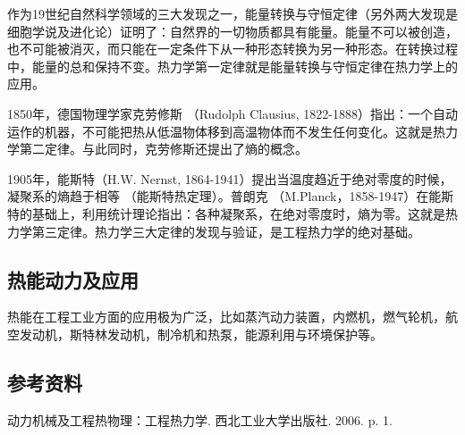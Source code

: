 作为19世纪自然科学领域的三大发现之一，能量转换与守恒定律（另外两大发现是细胞学说及进化论）证明了：自然界的一切物质都具有能量。能量不可以被创造，也不可能被消灭，而只能在一定条件下从一种形态转换为另一种形态。在转换过程中，能量的总和保持不变。热力学第一定律就是能量转换与守恒定律在热力学上的应用。

1850年，德国物理学家克劳修斯 （Rudolph Clausius, 1822-1888）指出：一个自动运作的机器，不可能把热从低温物体移到高温物体而不发生任何变化。这就是热力学第二定律。与此同时，克劳修斯还提出了熵的概念。

1905年，能斯特（H.W. Nernst, 1864-1941）提出当温度趋近于绝对零度的时候， 凝聚系的熵趋于相等 （能斯特热定理）。普朗克 （M.Planck，1858-1947）在能斯特的基础上，利用统计理论指出：各种凝聚系，在绝对零度时，熵为零。这就是热力学第三定律。热力学三大定律的发现与验证，是工程热力学的绝对基础。

\subsection{热能动力及应用}
热能在工程工业方面的应用极为广泛，比如蒸汽动力装置，内燃机，燃气轮机，航空发动机，斯特林发动机，制冷机和热泵，能源利用与环境保护等。

\subsection{参考资料}
动力机械及工程热物理：工程热力学. 西北工业大学出版社. 2006. p. 1.